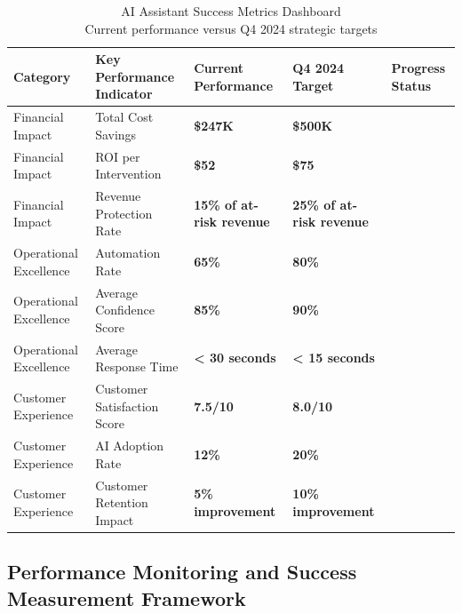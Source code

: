 \documentclass[
  letterpaper,
  DIV=11,
  numbers=noendperiod]{scrartcl}
\begin{document}
\begin{table}
\caption*{
{\large AI Assistant Success Metrics Dashboard} \\ 
{\small Current performance versus Q4 2024 strategic targets}
} 
\fontsize{9.0pt}{10.8pt}\selectfont
\begin{tabular*}{\linewidth}{@{\extracolsep{\fill}}lllll}
\toprule
Category & Key Performance Indicator & Current Performance & Q4 2024 Target & Progress Status \\ 
\midrule\addlinespace[2.5pt]
Financial Impact & Total Cost Savings & {\bfseries \$247K} & {\bfseries \$500K} & {\cellcolor[HTML]{FFD600}{\textcolor[HTML]{000000}{On Track}}} \\ 
Financial Impact & ROI per Intervention & {\bfseries \$52} & {\bfseries \$75} & {\cellcolor[HTML]{4CD964}{\textcolor[HTML]{000000}{Exceeding}}} \\ 
Financial Impact & Revenue Protection Rate & {\bfseries 15\% of at-risk revenue} & {\bfseries 25\% of at-risk revenue} & {\cellcolor[HTML]{FFD600}{\textcolor[HTML]{000000}{On Track}}} \\ 
Operational Excellence & Automation Rate & {\bfseries 65\%} & {\bfseries 80\%} & {\cellcolor[HTML]{FFD600}{\textcolor[HTML]{000000}{On Track}}} \\ 
Operational Excellence & Average Confidence Score & {\bfseries 85\%} & {\bfseries 90\%} & {\cellcolor[HTML]{4CD964}{\textcolor[HTML]{000000}{Exceeding}}} \\ 
Operational Excellence & Average Response Time & {\bfseries < 30 seconds} & {\bfseries < 15 seconds} & {\cellcolor[HTML]{FFD600}{\textcolor[HTML]{000000}{On Track}}} \\ 
Customer Experience & Customer Satisfaction Score & {\bfseries 7.5/10} & {\bfseries 8.0/10} & {\cellcolor[HTML]{FFD600}{\textcolor[HTML]{000000}{On Track}}} \\ 
Customer Experience & AI Adoption Rate & {\bfseries 12\%} & {\bfseries 20\%} & {\cellcolor[HTML]{00C2FF}{\textcolor[HTML]{000000}{Behind}}} \\ 
Customer Experience & Customer Retention Impact & {\bfseries 5\% improvement} & {\bfseries 10\% improvement} & {\cellcolor[HTML]{FFD600}{\textcolor[HTML]{000000}{On Track}}} \\ 
\bottomrule
\end{tabular*}
\end{table}

\subsection{Performance Monitoring and Success Measurement
Framework}\label{performance-monitoring-and-success-measurement-framework}
\end{document}

